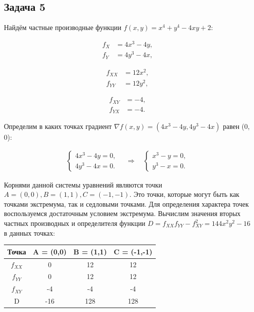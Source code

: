 \documentclass[a4paper,11pt]{article}
\begin{document}
\subsection{Задача 5}

Найдём частные производные функции $f(x,y) = x^4 + y^4 -4xy + 2$:

\begin{minipage}{0.4\linewidth}  
\begin{align*}
f_X & = 4x^3 -4y, \\
f_Y & = 4y^3 -4x,
\end{align*}
\end{minipage}  
\begin{minipage}{0.3\linewidth}  
\begin{align*}
f_{XX} & = 12x^2, \\
f_{YY} & = 12y^2,
\end{align*}
\end{minipage}
\begin{minipage}{0.3\linewidth}
\begin{align*}
f_{XY} & = -4, \\
f_{YX} & = -4.
\end{align*}
\end{minipage}

\vspace{1em}

Определим в каких точках градиент $\nabla f(x, y) = (4x^3-4y, 4y^3 -4x)$ равен (0, 0):

\begin{align*}
\begin{cases*}
4x^3 - 4y = 0,\\
4y^3 - 4x = 0.
\end{cases*}
\quad \Rightarrow \quad 
\begin{cases*}
x^3 - y = 0,\\
y^3 - x = 0.
\end{cases*}
\end{align*}

Корнями данной системы уравнений являются точки $A = (0, 0), B = (1, 1), C = (-1, -1)$. Это точки, которые могут быть как точками экстремума, так и седловыми точками. Для определения характера точек воспользуемся достаточным условием экстремума. Вычислим значения вторых частных производных и определителя функции $D = f_{XX}f_{YY}-f_{XY}^2 = 144x^2y^2 - 16$ в данных точках:

\begin{center}
\begin{tabular}{|c|c|c|c|}
\hline 
Точка & A = (0,0) & B = (1,1) & C = (-1,-1) \\ 
\hline 
$f_{XX}$ &  0 &  12 & 12 \\ 
$f_{YY}$ &  0 &  12 & 12 \\ 
$f_{XY}$ & -4 &  -4 & -4 \\ 
\hline 
D & -16 & 128 & 128 \\ 
\hline 
\end{tabular} 
\end{center}
\end{document}
